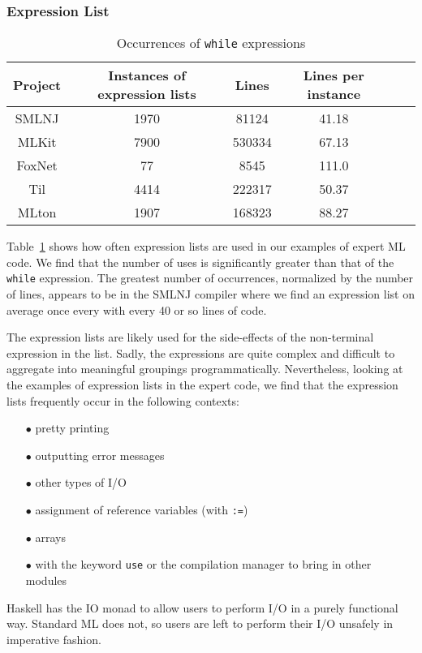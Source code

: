 \documentclass[12pt,abstracton]{scrartcl}
\begin{document}
\subsubsection{Expression List}
\begin{table}[h!]
\centering
\begin{tabular}{|c||c|c||c|c|c|}
\hline
Project & Instances of expression lists & Lines & Lines per instance \\ \hline\hline
SMLNJ & 1970 & 81124 & 41.18 \\ 
MLKit & 7900 & 530334 & 67.13 \\
FoxNet & 77 & 8545 & 111.0 \\
Til & 4414 & 222317 & 50.37 \\
MLton & 1907 & 168323 & 88.27 \\ \hline
\end{tabular}
\caption{Occurrences of \texttt{while} expressions}
\label{table:explist}
\end{table}
Table~\ref{table:explist} shows how often expression lists are used in our
examples of expert ML code. We find that the number of uses is significantly
greater than that of the \texttt{while} expression. The greatest number
of occurrences, normalized by the number of lines, appears to be in the SMLNJ
compiler where we find an expression list on average once every with every
40 or so lines of code.

The expression lists are likely used for the side-effects of the non-terminal
expression in the list. Sadly, the expressions are quite complex and difficult
to aggregate into meaningful groupings programmatically. Nevertheless,
looking at the examples of expression lists in the expert code, we find that
the expression lists frequently occur in the following contexts:
\begin{itemize}
\item[$\bullet$] pretty printing
\item[$\bullet$] outputting error messages
\item[$\bullet$] other types of I/O
\item[$\bullet$] assignment of reference variables (with \texttt{:=})
\item[$\bullet$] arrays
\item[$\bullet$] with the keyword \texttt{use} or the compilation manager to bring in other modules
\end{itemize}

Haskell has the IO monad to allow users to perform I/O in a purely functional way. \cite{Jon93}
Standard ML does not, so users are left to perform their
I/O unsafely in imperative fashion.
\end{document}
